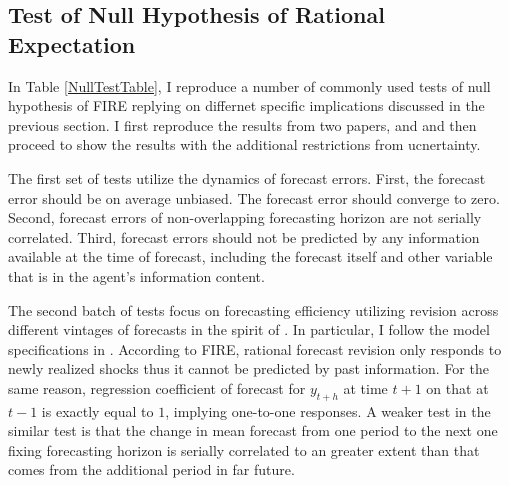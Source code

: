 \documentclass[]{article}
\begin{document}
\subsection{Test of Null Hypothesis of Rational Expectation}

In Table \ref{NullTestTable}, I reproduce a number of commonly used tests of null hypothesis of FIRE replying on differnet specific implications discussed in the previous section. I first reproduce the results from two papers, \cite{mankiw2003disagreement} and \cite{fuhrer2018intrinsic} and then proceed to show the results with the additional restrictions from ucnertainty. 

The first set of tests utilize the dynamics of forecast errors. First, the forecast error should be on average unbiased. The forecast error should converge to zero. Second, forecast errors of non-overlapping forecasting horizon are not serially correlated.  Third, forecast errors should not be predicted by any information available at the time of forecast, including the forecast itself and other variable that is in the agent's information content. 

The second batch of tests focus on  forecasting efficiency utilizing revision across different vintages of forecasts in the spirit of \cite{nordhaus1987forecasting}. In particular, I follow the model specifications in \cite{fuhrer2018intrinsic}. According to FIRE, rational forecast revision only responds to newly realized shocks thus it cannot be predicted by past information. For the same reason, regression coefficient of forecast for $y_{t+h}$  at time $t+1$ on that at $t-1$ is exactly equal to $1$, implying one-to-one responses.  A weaker test in the similar test is that the change in mean forecast from one period to the next one fixing forecasting horizon is serially correlated to an greater extent than that comes from the additional period in far future. 
\end{document}
